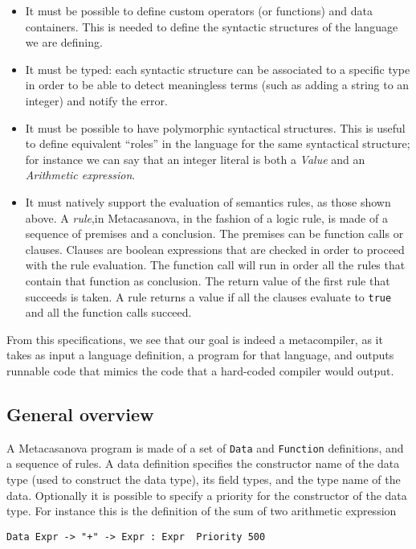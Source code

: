 \begin{itemize}
	\item It must be possible to define custom operators (or functions) and data containers. This is needed to define the syntactic structures of the language we are defining.
	\item It must be typed: each syntactic structure can be associated to a specific type in order to be able to detect meaningless terms (such as adding a string to an integer) and notify the error.
	\item It must be possible to have polymorphic syntactical structures. This is useful to define equivalent ``roles'' in the language for the same syntactical structure; for instance we can say that an integer literal is both a \textit{Value} and an \textit{Arithmetic expression}.
	\item It must natively support the evaluation of semantics rules, as those shown above. A \textit{rule},in Metacasanova, in the fashion of a logic rule, is made of a sequence of premises and a conclusion. The premises can be function calls or clauses. Clauses are boolean expressions that are checked in order to proceed with the rule evaluation. The function call will run in order all the rules that contain that function as conclusion. The return value of the first rule that succeeds is taken. A rule returns a value if all the clauses evaluate to \texttt{true} and all the function calls succeed.
\end{itemize}

From this specifications, we see that our goal is indeed a metacompiler, as it takes as input a language definition, a program for that language, and outputs runnable code that mimics the code that a hard-coded compiler would output.

\subsection{General overview}

A Metacasanova program is made of a set of \texttt{Data} and \texttt{Function} definitions, and a sequence of rules. A data definition specifies the constructor name of the data type (used to construct the data type), its field types, and the type name of the data. Optionally it is possible to specify a priority for the constructor of the data type. For instance this is the definition of the sum of two arithmetic expression

\begin{lstlisting}
Data Expr -> "+" -> Expr : Expr  Priority 500
\end{lstlisting}

